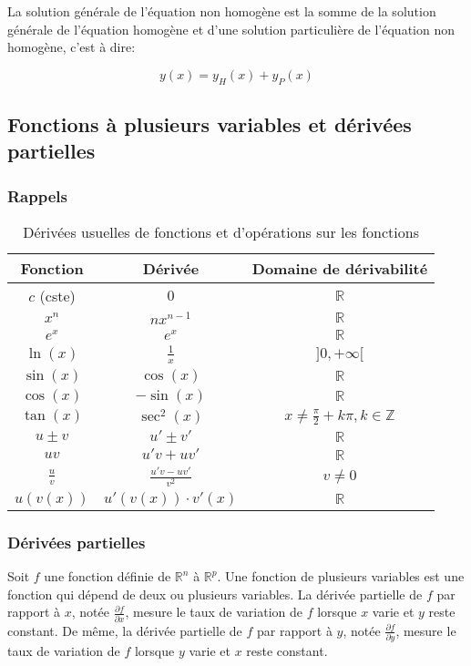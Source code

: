 La solution générale de l'équation non homogène est la somme de la solution générale de l'équation homogène et d'une solution particulière de l'équation non homogène, c'est à dire:

$$
    y(x) = y_H(x) + y_P(x)  
$$

\subsection{Fonctions à plusieurs variables et dérivées partielles}

\subsubsection{Rappels}

\begin{table}[h]
\centering
\begin{tabular}{|c|c|c|}
\hline
Fonction & Dérivée & Domaine de dérivabilité \\ \hline
$c$ (cste) & $0$ & $\mathbb{R}$ \\ \hline
$x^n$ & $nx^{n-1}$ & $\mathbb{R}$ \\ \hline
$e^x$ & $e^x$ & $\mathbb{R}$ \\ \hline
$\ln(x)$ & $\frac{1}{x}$ & $]0, +\infty[$ \\ \hline
$\sin(x)$ & $\cos(x)$ & $\mathbb{R}$ \\ \hline
$\cos(x)$ & $-\sin(x)$ & $\mathbb{R}$ \\ \hline
$\tan(x)$ & $\sec^2(x)$ & $x \neq \frac{\pi}{2} + k\pi, k \in \mathbb{Z}$ \\ \hline
$u \pm v$ & $u' \pm v'$ & $\mathbb{R}$ \\ \hline
$uv$ & $u'v + uv'$ & $\mathbb{R}$ \\ \hline
$\frac{u}{v}$ & $\frac{u'v - uv'}{v^2}$ & $v \neq 0$ \\ \hline
$u(v(x))$ & $u'(v(x)) \cdot v'(x)$ & $\mathbb{R}$ \\ \hline
\end{tabular}
\caption{Dérivées usuelles de fonctions et d'opérations sur les fonctions}
\end{table}

\subsubsection{Dérivées partielles}

Soit $f$ une fonction définie de $\mathbb{R}^n$ à $\mathbb{R}^p$.
Une fonction de plusieurs variables est une fonction qui dépend de deux ou plusieurs variables. La dérivée partielle de $f$ par rapport à $x$, notée $\frac{\partial f}{\partial x}$, mesure le taux de variation de $f$ lorsque $x$ varie et $y$ reste constant. De même, la dérivée partielle de $f$ par rapport à $y$, notée $\frac{\partial f}{\partial y}$, mesure le taux de variation de $f$ lorsque $y$ varie et $x$ reste constant.


